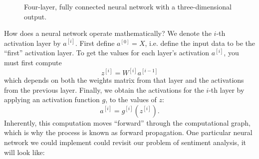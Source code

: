 \documentclass[12pt]{article}
\begin{document}
\begin{figure}[h]
  \label{fig: fullyconnectedfourlayerneuralnetwork}
  \caption{Four-layer, fully connected neural network with a three-dimensional output.} \end{figure}

How does a neural network operate mathematically? We denote the $i$-th activation layer by $a^{[i]}$. First define $a^{[0]} = X$, i.e. define the input data to be the ``first'' activation layer. To get the values for each layer's activation $a^{[i]}$, you must first compute
\[
  z^{[i]} = W^{[i]} a^{[i-1]}
\]
which depends on both the weights matrix from that layer and the activations from the previous layer. Finally, we obtain the activations for the $i$-th layer by applying an activation function $g$, to the values of $z$:
\[
  a^{[i]} = g^{[i]}(z^{[i]}).
\]
Inherently, this computation moves ``forward'' through the computational graph, which is why the process is known as forward propagation. One particular neural network we could implement could revisit our problem of sentiment analysis, it will look like:
\end{document}
